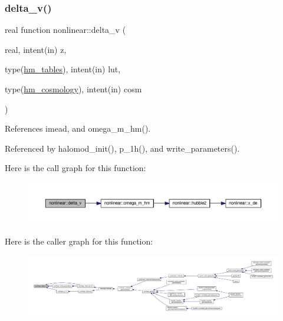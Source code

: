 \subsubsection{\texorpdfstring{delta\+\_\+v()}{delta\_v()}}
{\footnotesize\ttfamily real function nonlinear\+::delta\+\_\+v (\begin{DoxyParamCaption}\item[{real, intent(in)}]{z,  }\item[{type(\mbox{\hyperlink{structnonlinear_1_1hm__tables}{hm\+\_\+tables}}), intent(in)}]{lut,  }\item[{type(\mbox{\hyperlink{structnonlinear_1_1hm__cosmology}{hm\+\_\+cosmology}}), intent(in)}]{cosm }\end{DoxyParamCaption})\hspace{0.3cm}{\ttfamily [private]}}



References imead, and omega\+\_\+m\+\_\+hm().



Referenced by halomod\+\_\+init(), p\+\_\+1h(), and write\+\_\+parameters().

Here is the call graph for this function\+:
\nopagebreak
\begin{figure}[H]
\begin{center}
\leavevmode
\includegraphics[width=350pt]{namespacenonlinear_a73fccef372213a59eed00701677d1cdf_cgraph}
\end{center}
\end{figure}
Here is the caller graph for this function\+:
\nopagebreak
\begin{figure}[H]
\begin{center}
\leavevmode
\includegraphics[width=350pt]{namespacenonlinear_a73fccef372213a59eed00701677d1cdf_icgraph}
\end{center}
\end{figure}
\mbox{\label{namespacenonlinear_aaa7e906c253a54ffb73bab9e5dfd1397}} 
